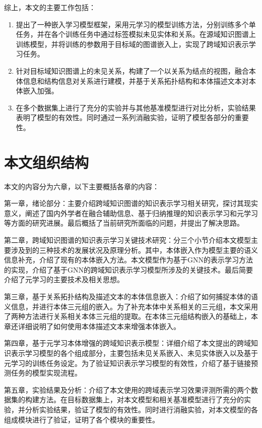 综上，本文的主要工作包括：
\begin{enumerate}[label=\arabic*)]
  \item 提出了一种嵌入学习模型框架，采用元学习的模型训练方法，分别训练多个单任务，并在各个训练任务中通过标签模拟未见实体和关系。在源域知识图谱上训练模型，并将训练的参数用于目标域的图谱嵌入上，实现了跨域知识表示学习任务。
  \item 针对目标域知识图谱上的未见关系，构建了一个以关系为结点的视图，融合本体信息和结构信息对关系进行建模，并基于关系拓扑结构和本体描述文本对本体嵌入加强。
  \item 在多个数据集上进行了充分的实验并与其他基准模型进行对比分析，实验结果表明了模型的有效性。同时通过一系列消融实验，证明了模型各部分的重要性。
\end{enumerate}

\section{本文组织结构}
本文的内容分为六章，以下主要概括各章的内容：

第一章，绪论部分：主要介绍跨域知识图谱的知识表示学习相关研究，探讨其现实意义，阐述了国内外学者在融合辅助信息、基于归纳推理的知识表示学习和元学习等方面的研究进展。最后概括了当前研究所面临的问题，并提出了解决思路。

第二章，跨域知识图谱的知识表示学习关键技术研究：分三个小节介绍本文模型主要涉及到的三种技术的发展状况及原理分析。其中，本体嵌入作为模型主要的语义信息补充，介绍了现有的本体嵌入方法。本文模型作为基于GNN的表示学习方法的实现，介绍了基于GNN的跨域知识表示学习模型所涉及的关键技术。最后简要介绍了元学习的主要技术及相关思想。

第三章，基于关系拓扑结构及描述文本的本体信息嵌入：介绍了如何捕捉本体的语义信息，并进行本体三元组的嵌入。为了补充本体中关系相关的三元组，本文采用了两种方法进行关系相关本体三元组的提取。在本体三元组结构嵌入的基础上，本章还详细说明了如何使用本体描述文本来增强本体嵌入。

第四章，基于元学习本体增强的跨域知识表示模型：详细介绍了本文提出的跨域知识表示学习模型的各个组成部分，主要包括未见关系嵌入、未见实体嵌入以及基于元学习的训练任务设定。为了验证知识表示学习模型的有效性，介绍了基于链接预测任务的模型实现流程。

第五章，实验结果及分析：介绍了本文使用的跨域表示学习效果评测所需的两个数据集的构建方法。在目标数据集上，对本文模型和相关基准模型进行了充分的实验，并分析实验结果，验证了模型的有效性。同时进行消融实验，对本文模型的各组成模块进行了验证，证明了各个模块的重要性。

